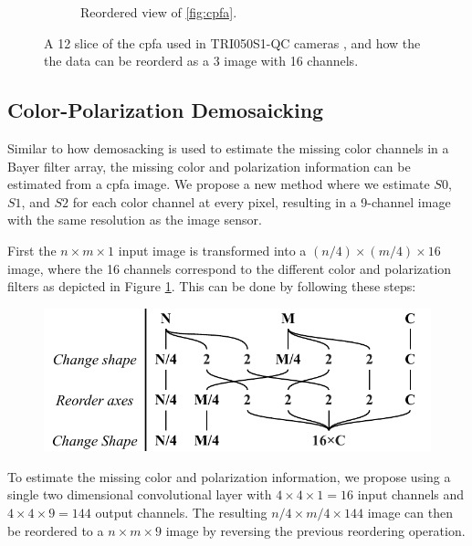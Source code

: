 \begin{figure}[H]
\begin{subfigure}[B]{.48\textwidth}
        \caption{Reordered view of \ref{fig:cpfa}. \label{fig:cpfa_reorder}}
    \end{subfigure}
    \caption{A 12 slice of the \gls{cpfa} used in TRI050S1-QC cameras \cite{lucidvisionlabsTritonMPPolarized2020}, and how the the data can be reorderd as a 3 image with 16 channels. \label{fig:polarization_sensor}}
\end{figure}

\subsection{Color-Polarization Demosaicking}
Similar to how demosacking is used to estimate the missing color channels in a Bayer filter array, the missing color and polarization information can be estimated from a \gls{cpfa} image.
We propose a new method where we estimate $S0$, $S1$, and $S2$ for each color channel at every pixel, resulting in a 9-channel image with the same resolution as the image sensor.

First the $n \times m \times 1$ input image is transformed into a $(n/4) \times (m/4) \times 16$ image, where the 16 channels correspond to the different color and polarization filters as depicted in Figure \ref{fig:cpfa_reorder}.
This can be done by following these steps:
\begin{figure}[H]
    \centering
    \includegraphics[width=.6\textwidth]{figures/transformation.pdf}
\end{figure}%
To estimate the missing color and polarization information, we propose using a single two dimensional convolutional layer with $4 \times 4 \times 1=16$ input channels and $4 \times 4 \times 9 = 144$ output channels.
The resulting $n/4 \times m/4 \times 144$ image can then be reordered to a $n \times m \times 9$ image by reversing the previous reordering operation.

